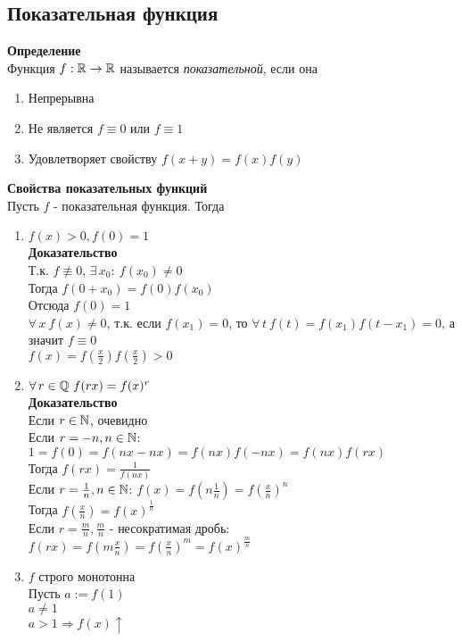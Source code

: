 \documentclass[12pt]{article}
\begin{document}
\subsection{Показательная функция}
\textbf{Определение}\\
Функция $f:\mathbb{R} \rightarrow \mathbb{R}$ называется \textit{показательной}, если она
\begin{enumerate}
    \item Непрерывна
    \item Не является $f \equiv 0$ или $f \equiv 1$
    \item Удовлетворяет свойству $f(x+y) = f(x)f(y)$
\end{enumerate}
\textbf{Свойства показательных функций}\\
Пусть $f$ - показательная функция. Тогда 
\begin{enumerate}
    \item $f(x) > 0, f(0) = 1$\\
    \textbf{Доказательство}\\
    Т.к. $f \not\equiv 0$, $\exists\, x_0:\ f(x_0) \neq 0$\\
    Тогда $f(0+x_0) = f(0)f(x_0)$\\
    Отсюда $f(0) = 1$\\
    $\forall\,x\ f(x) \neq 0$, т.к. если $f(x_1) = 0$, то $\forall\,t\ f(t) = f(x_1)f(t-x_1) = 0$, а значит $f\equiv 0$\\
    $f(x) = f(\frac x2)f(\frac x2) > 0$
    \item $\forall\,r \in \bb{Q}\ f(rx)=f(x)^r$\\
    \textbf{Доказательство}\\
    Если $r \in \mathbb{N}$, очевидно\\
    Если $r = -n, n \in \mathbb{N}$: $1 = f(0) = f(nx-nx) = f(nx)f(-nx) = f(nx)f(rx)$\\ Тогда $f(rx) = \frac 1{f(nx)}$\\
    Если $r = \frac 1n, n \in \mathbb{N}$: $f(x) = f(n\frac1n) = f(\frac xn)^n$\\ Тогда $f(\frac xn) = f(x)^{\frac 1n}$\\
    Если $r = \frac mn, \frac mn$ - несократимая дробь: $f(rx) = f(m\frac xn) = f(\frac xn)^m = f(x)^\frac mn$
    \item $f$ строго монотонна\\
    Пусть $a := f(1)$\\
    $a \neq 1$\\
    $a > 1 \Rightarrow f(x) \uparrow$\\

\end{enumerate}
\end{document}
